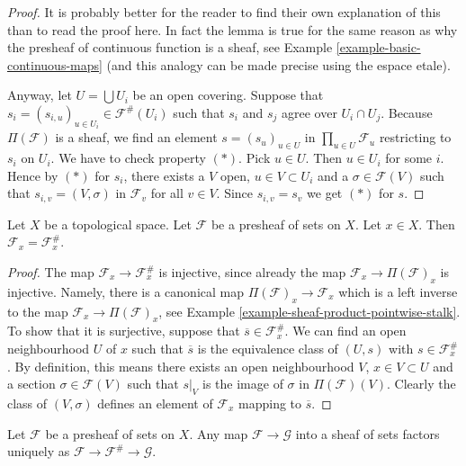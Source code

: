 \begin{proof}
It is probably better for the reader to find their own explanation
of this than to read the proof here. In fact the lemma is true
for the same reason as why the presheaf of continuous
function is a sheaf, see Example \ref{example-basic-continuous-maps}
(and this analogy can be made precise using the espace etale).

\medskip\noindent
Anyway, let $U = \bigcup U_i$ be an open covering.
Suppose that $s_i = (s_{i,u})_{u \in U_i} \in \mathcal{F}^{\#}(U_i)$
such that $s_i$ and $s_j$ agree over $U_i \cap U_j$.
Because $\Pi(\mathcal{F})$ is a sheaf,
we find an element $s = (s_u)_{u\in U}$ in $\prod_{u\in U} \mathcal{F}_u$
restricting to $s_i$ on $U_i$. We have to check property $(*)$.
Pick $u \in U$. Then $u \in U_i$ for some $i$. Hence by $(*)$ for $s_i$,
there exists a $V$ open, $u \in V \subset U_i$
and a $\sigma \in \mathcal{F}(V)$
such that $s_{i, v} = (V, \sigma)$ in $\mathcal{F}_v$ 
for all $v \in V$. Since $s_{i,v} = s_v$ we get $(*)$ for $s$.
\end{proof}

\begin{lemma}
\label{lemma-stalk-sheafification}
Let $X$ be a topological space.
Let $\mathcal{F}$ be a presheaf of sets on $X$.
Let $x \in X$. Then $\mathcal{F}_x = \mathcal{F}^\#_x$.
\end{lemma}

\begin{proof}
The map $\mathcal{F}_x \to \mathcal{F}^\#_x$
is injective, since already the map
$\mathcal{F}_x \to \Pi(\mathcal{F})_x$ is injective.
Namely, there is a canonical map $\Pi(\mathcal{F})_x \to \mathcal{F}_x$
which is a left inverse to the map $\mathcal{F}_x \to \Pi(\mathcal{F})_x$,
see Example \ref{example-sheaf-product-pointwise-stalk}.
To show that it is surjective, suppose that
$\overline{s} \in \mathcal{F}^\#_x$.
We can find an open neighbourhood $U$ of $x$ such that
$\overline{s}$ is the equivalence class of $(U, s)$
with $s \in \mathcal{F}^\#_x$.
By definition, this means there exists an open neighbourhood
$V$, $x \in V \subset U$ and a section $\sigma \in \mathcal{F}(V)$
such that $s|_V$ is the image of $\sigma$ in $\Pi(\mathcal{F})(V)$.
Clearly the class of $(V, \sigma)$ defines an element of
$\mathcal{F}_x$ mapping to $\overline{s}$.
\end{proof}

\begin{lemma}
\label{lemma-sheafifiy-universal}
Let $\mathcal{F}$ be a presheaf of sets on $X$.
Any map $\mathcal{F} \to \mathcal{G}$ into a sheaf of sets 
factors uniquely as
$\mathcal{F} \to \mathcal{F}^\# \to \mathcal{G}$.
\end{lemma}

